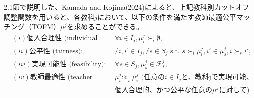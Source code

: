 \documentclass[12pt, a4paper]{article}
\theoremstyle{definition}
\theoremstyle{remark}
\theoremstyle{plain}
\begin{document}




2.1節で説明した、Kamada and Kojima(2024)によると、上記教科別カットオフ調整関数を用いると、各教科$j$において、以下の条件を満たす教師最適公平マッチング（TOFM）$\mu^j$を求めることができる。
\begin{align*}
 &(i) \text{個人合理性 (individual rationality)}: && \forall i \in I_j, \mu^j_i \succ_i \emptyset,\\
 &(ii) \text{公平性 (fairness)}:  && \nexists i, i' \in I_j, \nexists s \in S_j \text{ s.t. } s \succ_i \mu^j_i, i' \in \mu^j_s, i \succ_s i',\\
 &(iii) \text{実現可能性 (feasibility)}:  && \forall s \in S_j, \mu^j_s \in \mathcal{F}^j_s,\\
 &(iv) \text{教師最適性 (teacher optimality)}: && \mu^j_i \succeq_i \bar{\mu}^j_i \text{ (任意の$i \in I_j$と、教科jで実現可能、}\\
 & && \text{個人合理的、かつ公平な任意の$\bar{\mu}^j$に対して)}
\end{align*}
\end{document}
